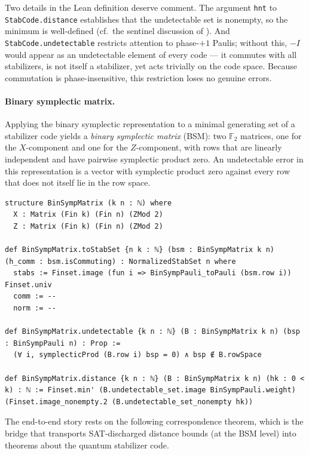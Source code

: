 Two details in the Lean definition deserve comment. The argument \lstinline{hnt}
to \lstinline{StabCode.distance} establishes that the undetectable set is
nonempty, so the minimum is well-defined (cf.\ the sentinel discussion of
). And \lstinline{StabCode.undetectable} restricts attention to
phase-$+1$ Paulis; without this, $-I$ would appear as an undetectable element of
every code --- it commutes with all stabilizers, is not itself a stabilizer, yet
acts trivially on the code space. Because commutation is phase-insensitive, this
restriction loses no genuine errors.

\paragraph{Binary symplectic matrix.} Applying the binary symplectic
representation to a minimal generating set of a stabilizer code yields a
\emph{binary symplectic matrix} (BSM): two $\mathbb{F}_2$ matrices, one for the
$X$-component and one for the $Z$-component, with rows that are linearly
independent and have pairwise symplectic product zero. An undetectable error in
this representation is a vector with symplectic product zero against every row
that does not itself lie in the row space.

\begin{lstlisting}
structure BinSympMatrix (k n : ℕ) where
  X : Matrix (Fin k) (Fin n) (ZMod 2)
  Z : Matrix (Fin k) (Fin n) (ZMod 2)

def BinSympMatrix.toStabSet {n k : ℕ} (bsm : BinSympMatrix k n) (h_comm : bsm.isCommuting) : NormalizedStabSet n where
  stabs := Finset.image (fun i => BinSympPauli_toPauli (bsm.row i)) Finset.univ
  comm := --
  norm := --

def BinSympMatrix.undetectable {k n : ℕ} (B : BinSympMatrix k n) (bsp : BinSympPauli n) : Prop :=
  (∀ i, symplecticProd (B.row i) bsp = 0) ∧ bsp ∉ B.rowSpace

def BinSympMatrix.distance {k n : ℕ} (B : BinSympMatrix k n) (hk : 0 < k) : ℕ := Finset.min' (B.undetectable_set.image BinSympPauli.weight)
(Finset.image_nonempty.2 (B.undetectable_set_nonempty hk))
\end{lstlisting}

%

The end-to-end story rests on the following correspondence theorem, which is the
bridge that transports SAT-discharged distance bounds (at the BSM level) into
theorems about the quantum stabilizer code.

